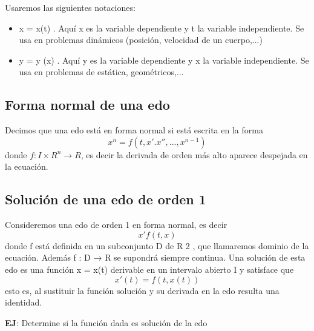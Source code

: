\documentclass{article}
\begin{document}
    Usaremos las siguientes notaciones:

    \begin{itemize}
        \item x = x(t) . Aquí x es la variable dependiente y t la variable independiente.
        Se usa en problemas dinámicos (posición, velocidad de un cuerpo,...)
        \item y = y (x) . Aquí y es la variable dependiente y x la variable independiente.
        Se usa en problemas de estática, geométricos,...
    \end{itemize}

    \subsection{Forma normal de una edo}

    Decimos que una edo está en forma normal si está escrita en la forma
    \begin{equation*}
        x^{n}=f(t,x'.x'',...,x^{n-1})
    \end{equation*}
    donde $f:I \times R^{n} \rightarrow R$, es decir la derivada de orden más alto aparece
    despejada en la ecuación.

    \subsection{Solución de una edo de orden 1}
    Consideremos una edo de orden 1 en forma normal, es decir
    \begin{equation*}
        x'f(t,x)
    \end{equation*}
    donde f está definida en un subconjunto D de R 2 , que llamaremos
    dominio de la ecuación. Además f : D → R se supondrá siempre
    continua.
    Una solución de esta edo es una función x = x(t) derivable en un
    intervalo abierto I y satisface que
    \begin{equation*}
        x'(t)=f(t,x(t))
    \end{equation*}
    esto es, al sustituir la función solución y su derivada en la edo resulta una
    identidad.
    \newpage

    \textbf{EJ}: Determine si la función dada es solución de la edo
\end{document}
